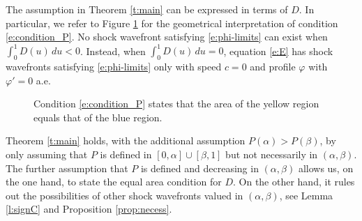 \documentclass[11pt,a4paper]{article}
\renewcommand{\phi}{\varphi}
\begin{document}
The assumption in Theorem \ref{t:main} can be expressed in terms of $D$. In particular, we refer to Figure \ref{f:Dcont} for the geometrical interpretation of condition \eqref{e:condition_P}. 
No shock wavefront satisfying \eqref{e:phi-limits} can exist when $\int_{0}^{1}D(u) \, du<0$. Instead, when $\int_{0}^{1}D(u) \, du=0$, equation \eqref{e:E} has shock wavefronts satisfying \eqref{e:phi-limits} only with speed $c=0$ and profile $\phi$ with $\phi'=0$ a.e.

\begin{figure}[htb]
\begin{center}

\end{center}
\caption{\label{f:Dcont}{Condition \eqref{e:condition_P} states that the area of the yellow region equals that of the blue region.}}
\end{figure}

 Theorem \ref{t:main} holds, with the additional assumption $P(\alpha)>P(\beta)$, by only assuming that $P$ is defined in $[0,\alpha]\cup[\beta,1]$ but not necessarily in $(\alpha,\beta)$. The further assumption that $P$ is defined and decreasing in $(\alpha,\beta)$ allows us, on the one hand, to state the equal area condition for $D$. On the other hand, it rules out the possibilities of other shock wavefronts valued in $(\alpha,\beta)$, see Lemma \ref{l:signC} and Proposition \ref{prop:necess}.
\end{document}
